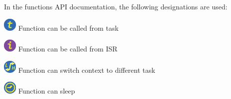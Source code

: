 In the functions A\+PI documentation, the following designations are used\+:


\begin{DoxyItemize}
\item   \includegraphics{attr_call_task.png}  Function can be called from task
\item   \includegraphics{attr_call_int.png}  Function can be called from I\+SR
\item   \includegraphics{attr_call_ct_sw.png}  Function can switch context to different task
\item   \includegraphics{attr_timeout.png}  Function can sleep 
\end{DoxyItemize}